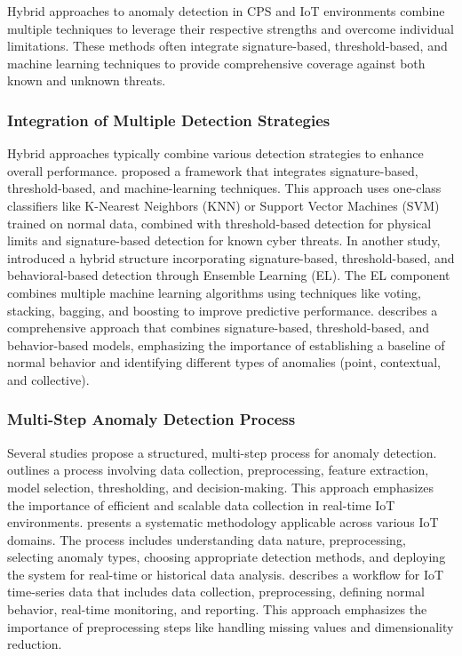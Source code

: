 Hybrid approaches to anomaly detection in CPS and IoT environments combine multiple techniques to leverage their respective strengths and overcome individual limitations. These methods often integrate signature-based, threshold-based, and machine learning techniques to provide comprehensive coverage against both known and unknown threats.

\subsubsection{Integration of Multiple Detection Strategies}

Hybrid approaches typically combine various detection strategies to enhance overall performance. \cite{54} proposed a framework that integrates signature-based, threshold-based, and machine-learning techniques. This approach uses one-class classifiers like K-Nearest Neighbors (KNN) or Support Vector Machines (SVM) trained on normal data, combined with threshold-based detection for physical limits and signature-based detection for known cyber threats. In another study, \cite{70} introduced a hybrid structure incorporating signature-based, threshold-based, and behavioral-based detection through Ensemble Learning (EL). The EL component combines multiple machine learning algorithms using techniques like voting, stacking, bagging, and boosting to improve predictive performance. \cite{16} describes a comprehensive approach that combines signature-based, threshold-based, and behavior-based models, emphasizing the importance of establishing a baseline of normal behavior and identifying different types of anomalies (point, contextual, and collective).

\subsubsection{Multi-Step Anomaly Detection Process}

Several studies propose a structured, multi-step process for anomaly detection. \cite{83} outlines a process involving data collection, preprocessing, feature extraction, model selection, thresholding, and decision-making. This approach emphasizes the importance of efficient and scalable data collection in real-time IoT environments. \cite{82} presents a systematic methodology applicable across various IoT domains. The process includes understanding data nature, preprocessing, selecting anomaly types, choosing appropriate detection methods, and deploying the system for real-time or historical data analysis. \cite{77} describes a workflow for IoT time-series data that includes data collection, preprocessing, defining normal behavior, real-time monitoring, and reporting. This approach emphasizes the importance of preprocessing steps like handling missing values and dimensionality reduction.

